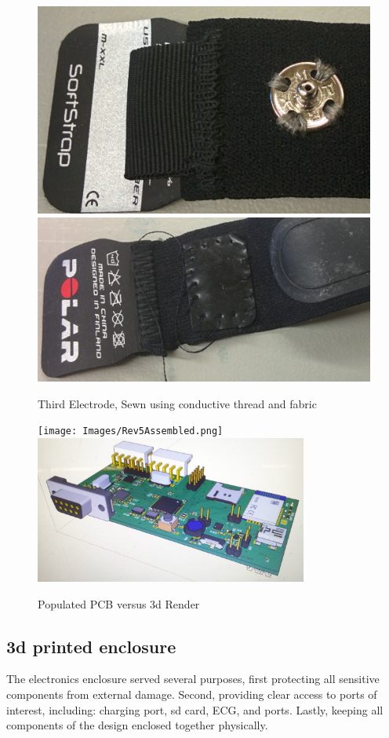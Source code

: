 \begin{figure}[ht]
\begin{center}
	\label{fig:polar_3rdSnap}
	\includegraphics[angle=0,scale=1,width=.51\textwidth]{Images/Polar_top.png} 
	\includegraphics[angle=0,scale=1,width=.51\textwidth]{Images/Polar_bottom.png}
	\caption{Third Electrode, Sewn using conductive thread and fabric}
\end{center}
\end{figure}

 

\begin{figure}[ht]
 \begin{center}
  \label{fig:PCBvsRender}
  \texttt{[image: Images/Rev5Assembled.png]} 
  \includegraphics[scale=1,width=0.8\textwidth]{Images/Rev5_prerender.png} 
  \caption{Populated PCB versus 3d Render}
 
 \end{center}
\end{figure}

\subsection {3d printed enclosure}
The electronics enclosure served several purposes, first protecting all sensitive components from external damage. Second, providing clear access to ports of interest, including: charging port, sd card, ECG, and  ports. Lastly, keeping all components of the design enclosed together physically. 

